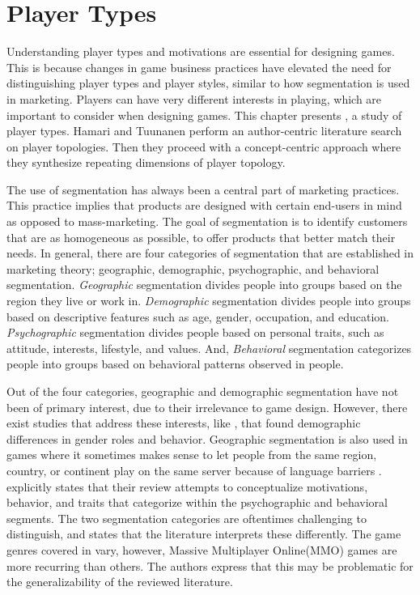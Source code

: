 \documentclass[../Main.tex]{subfiles}
\begin{document}
\section{Player Types}
\label{chap:playertypes}
Understanding player types and motivations are essential for designing games. This is because changes in game business practices have elevated the need for distinguishing player types and player styles, similar to how segmentation is used in marketing. Players can have very different interests in playing, which are important to consider when designing games. This chapter presents \citet{hamari_player_2014}, a study of player types. Hamari and Tuunanen perform an author-centric literature search on player topologies. Then they proceed with a concept-centric approach where they synthesize repeating dimensions of player topology. 

The use of segmentation has always been a central part of marketing practices. This practice implies that products are designed with certain end-users in mind as opposed to mass-marketing. The goal of segmentation is to identify customers that are as homogeneous as possible, to offer products that better match their needs. In general, there are four categories of segmentation that are established in marketing theory; geographic, demographic, psychographic, and behavioral segmentation. \textit{Geographic} segmentation divides people into groups based on the region they live or work in. \textit{Demographic} segmentation divides people into groups based on descriptive features such as age, gender, occupation, and education. \textit{Psychographic} segmentation divides people based on personal traits, such as attitude, interests, lifestyle, and values. And, \textit{Behavioral} segmentation categorizes people into groups based on behavioral patterns observed in people.

Out of the four categories, geographic and demographic segmentation have not been of primary interest, due to their irrelevance to game design. However, there exist studies that address these interests, like \citet{williams_looking_2009}, that found demographic differences in gender roles and behavior. Geographic segmentation is also used in games where it sometimes makes sense to let people from the same region, country, or continent play on the same server because of language barriers \citep{royce_massively_2015}. \citet{hamari_player_2014} explicitly states that their review attempts to conceptualize motivations, behavior, and traits that categorize within the psychographic and behavioral segments. The two segmentation categories are oftentimes challenging to distinguish, and \citet{hamari_player_2014} states that the literature interprets these differently. The game genres covered in \citet{hamari_player_2014} vary, however, Massive Multiplayer Online(MMO) games are more recurring than others. The authors express that this may be problematic for the generalizability of the reviewed literature.
\end{document}
